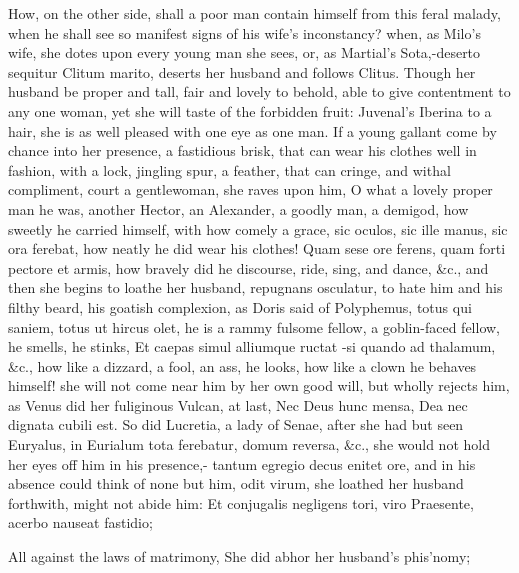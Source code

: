 {How, on the other side, shall a poor man contain himself from this
feral malady, when he shall see so manifest signs of his wife's
inconstancy? when, as Milo's wife, she dotes upon every young man she
sees, or, as Martial's Sota,-deserto sequitur Clitum marito,
deserts her husband and follows Clitus. Though her husband be proper
and tall, fair and lovely to behold, able to give contentment to any
one woman, yet she will taste of the forbidden fruit: Juvenal's Iberina
to a hair, she is as well pleased with one eye as one man. If a young
gallant come by chance into her presence, a fastidious brisk, that can
wear his clothes well in fashion, with a lock, jingling spur, a
feather, that can cringe, and withal compliment, court a gentlewoman,
she raves upon him, O what a lovely proper man he was, another Hector,
an Alexander, a goodly man, a demigod, how sweetly he carried himself,
with how comely a grace, sic oculos, sic ille manus, sic ora ferebat,
how neatly he did wear his clothes!  Quam sese ore ferens, quam
forti pectore et armis, how bravely did he discourse, ride, sing, and
dance, \&c., and then she begins to loathe her husband, repugnans
osculatur, to hate him and his filthy beard, his goatish complexion, as
Doris said of Polyphemus, totus qui saniem, totus ut hircus olet,
he is a rammy fulsome fellow, a goblin-faced fellow, he smells, he
stinks, Et caepas simul alliumque ructat -si quando ad thalamum,
\&c., how like a dizzard, a fool, an ass, he looks, how like a clown he
behaves himself! she will not come near him by her own good will,
but wholly rejects him, as Venus did her fuliginous Vulcan, at last,
Nec Deus hunc mensa, Dea nec dignata cubili est. So did Lucretia,
a lady of Senae, after she had but seen Euryalus, in Eurialum tota
ferebatur, domum reversa, \&c., she would not hold her eyes off him in
his presence,- tantum egregio decus enitet ore, and in his
absence could think of none but him, odit virum, she loathed her
husband forthwith, might not abide him:
Et conjugalis negligens tori, viro
Praesente, acerbo nauseat fastidio;

All against the laws of matrimony,
She did abhor her husband's phis'nomy;

}
